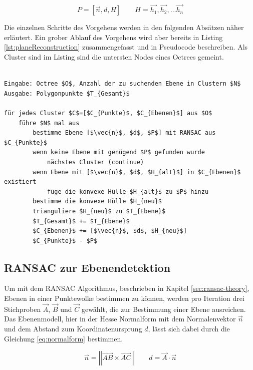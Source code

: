 \begin{equation} \label{eq:plane}
P=\left[\vec{n}, d, H\right] \qquad H=\vec{h_1}, \vec{h_2}, \ldots  \vec{h_n}
\end{equation}

Die einzelnen Schritte des Vorgehens werden in den folgenden Absätzen näher erläutert. Ein grober Ablauf des Vorgehens wird aber bereits in Listing \ref{lst:planeReconstruction} zusammengefasst und in Pseudocode beschreiben. Als Cluster sind im Listing sind die untersten Nodes eines Octrees gemeint.

\begin{lstlisting}[mathescape,caption=Planare Echtzeit Rekonstruktion, label=lst:planeReconstruction, float=htbp]

Eingabe: Octree $O$, Anzahl der zu suchenden Ebene in Clustern $N$
Ausgabe: Polygonpunkte $T_{Gesamt}$

für jedes Cluster $C$=[$C_{Punkte}$, $C_{Ebenen}$] aus $O$
    führe $N$ mal aus
        bestimme Ebene [$\vec{n}$, $d$, $P$] mit RANSAC aus $C_{Punkte}$
        wenn keine Ebene mit genügend $P$ gefunden wurde
            nächstes Cluster (continue)
        wenn Ebene mit [$\vec{n}$, $d$, $H_{alt}$] in $C_{Ebenen}$ existiert	
            füge die konvexe Hülle $H_{alt}$ zu $P$ hinzu	
        bestimme die konvexe Hülle $H_{neu}$
        trianguliere $H_{neu}$ zu $T_{Ebene}$
        $T_{Gesamt}$ += $T_{Ebene}$
        $C_{Ebenen}$ += [$\vec{n}$, $d$, $H_{neu}$]
        $C_{Punkte}$ - $P$
\end{lstlisting}


\subsection{RANSAC zur Ebenendetektion} \label{sec:ransac}

Um mit dem RANSAC Algorithmus, beschrieben in Kapitel \ref{sec:ransac-theory}, Ebenen in einer Punktewolke bestimmen zu können, werden pro Iteration drei Stichproben \(\vec{A}\), \(\vec{B}\) und \(\vec{C}\) gewählt, die zur Bestimmung einer Ebene ausreichen. Das Ebenenmodell, hier in der Hesse Normalform mit dem Normalenvektor \(\vec{n}\) und dem Abstand zum Koordinatenursprung \(d\), lässt sich dabei durch die Gleichung \ref{eq:normalform} bestimmen.

\begin{equation}\label{eq:normalform}
\vec{n} =\left|\left| \vec{AB} \times \vec{AC}\right|\right|
\qquad
d = \vec{A} \cdot \vec{n}
\end{equation}

